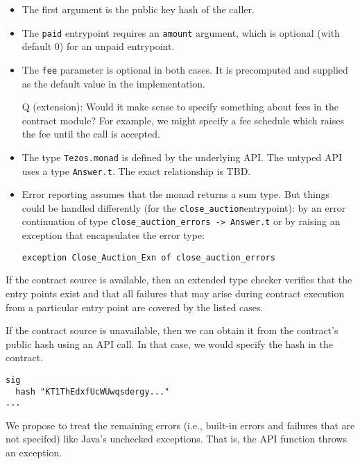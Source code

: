 \documentclass[a4paper]{llncs}
\begin{document}
\begin{itemize}
\item The first argument is the public key hash of the caller. 
\item The \lstinline/paid/ entrypoint requires an \lstinline/amount/
  argument, which is optional (with default 0) for an unpaid
  entrypoint.
\item The \lstinline/fee/ parameter is optional in both
  cases. It is precomputed and supplied as the default value in the
  implementation.

  Q (extension): Would it make sense to specify something about fees in the
  contract module? For example, we might specify a fee schedule which
  raises the fee until the call is accepted.
\item The type \lstinline/Tezos.monad/ is defined by the underlying
  API. The untyped API uses a type \lstinline/Answer.t/. The exact
  relationship is TBD.
\item Error reporting assumes that the monad returns a sum type. But
  things could be handled differently (for the
  \lstinline/close_auction/entrypoint): by an error continuation of
  type \lstinline/close_auction_errors -> Answer.t/ or by
  raising an exception that encapsulates the error type:
\begin{lstlisting}
exception Close_Auction_Exn of close_auction_errors
\end{lstlisting}
\end{itemize}

If the contract source is available, then an extended type checker verifies that the entry points
exist and that all failures that may arise during contract execution from a particular entry point
are covered by the listed cases.

If the contract source is unavailable, then we can obtain it from the
contract's public hash using an API call. In that case, we would
specify the hash in the contract.
\begin{lstlisting}
sig
  hash "KT1ThEdxfUcWUwqsdergy..."
...
\end{lstlisting}

We propose to treat the remaining errors (i.e., built-in errors
and failures that are not specifed) like Java's unchecked
exceptions. That is, the API function throws an exception.
\end{document}
